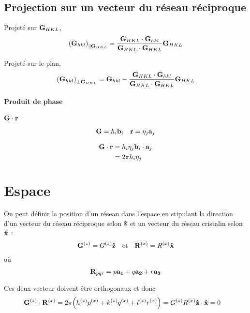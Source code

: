 \documentclass[11pt]{article}
\begin{document}
\subsection{Projection sur un vecteur du réseau réciproque} 

Projeté sur $\vb{G}_{HKL}$,
\begin{align*}
	\pqty{\vb{G}_{hkl}}_{\parallel\vb{G}_{HKL}} = \frac{\vb{G}_{HKL} \cdot \vb{G}_{hkl}}{\vb{G}_{HKL} \cdot \vb{G}_{HKL} }\vb{G}_{HKL} 
\end{align*}

Projeté sur le plan,
\begin{align*}
	\pqty{\vb{G}_{hkl}}_{\perp\vb{G}_{HKL}} = \vb{G}_{hkl} - \frac{\vb{G}_{HKL} \cdot \vb{G}_{hkl}}{\vb{G}_{HKL} \cdot \vb{G}_{HKL} }\vb{G}_{HKL} 
\end{align*}

\paragraph{Produit de phase} %
\label{par:produit_de_phase}

$\vb{G} \cdot \vb{r}$

\begin{align*}
	\vb{G} &= h_i \vb{b}_i & \vb{r} = \eta_j \vb{a}_j
\end{align*}

\begin{align*}
	\vb{G} \cdot \vb{r} 
	&= h_i \eta_j \vb{b}_i \cdot \vb{a}_j \\
	&= 2 \pi h_i \eta_j
\end{align*}

\section{Espace} %
\label{sec:espace}

On peut définir la position d'un réseau dans l'espace en stipulant la direction d'un vecteur du réseau réciproque selon $\vu{z}$ et un vecteur du réseau cristalin selon $\vu{x}$ :
\begin{align*}
	\vb{G}^{(z)} = G^{(z)}\vu{z} \qq{et} \vb{R}^{(x)} = R^{(x)} \vu{x}
\end{align*} où
\begin{align*}
	\vb{R}_{pqr} = p \vb{a_1} + q \vb{a_2} + r \vb{a_3}
\end{align*}

Ces deux vecteur doivent être orthogonaux et donc
\begin{align*}
	\vb{G}^{(z)} \cdot \vb{R}^{(x)} &= 2\pi\pqty{ h^{(z)}p^{(x)} + k^{(z)}q^{(x)} + l^{(z)}r^{(x)}} = G^{(z)}R^{(x)} \vu{z} \cdot \vu{x} = 0
\end{align*}
\end{document}
